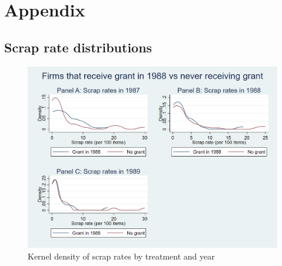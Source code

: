\section{Appendix}
\label{s:appendix}

\subsection{Scrap rate distributions}
\label{s:appendix_scrap}

\begin{figure}
    \centering
    \caption{Kernel density of scrap rates by treatment and year}
    \label{f:kernels}
    \includegraphics[width=1.0 \textwidth]{figures/kernels_combined}
\end{figure}
